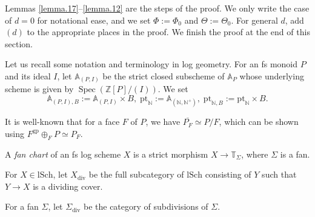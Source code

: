 \documentclass[10pt]{amsart}
\theoremstyle{definition}
\theoremstyle{remark}
\numberwithin{equation}{subsection}
\newcommand{\A}{\mathbb{A}}
\newcommand{\N}{\mathbb{N}}
\newcommand{\T}{\mathbb{T}}
\newcommand{\Z}{\mathbb{Z}}
\DeclareMathOperator{\Spec}{Spec}
\newcommand{\ol}{\overline}
\newcommand{\pt}{\mathrm{pt}}
\newcommand{\lSch}{\mathrm{lSch}}
\newcommand{\gp}{\mathrm{gp}}
\newcommand{\divi}{\mathrm{div}}
\begin{document}
Lemmas \ref{lemma.17}--\ref{lemma.12} are the steps of the proof.
We only write the case of $d=0$ for notational ease, and we set $\Phi:=\Phi_0$ and $\Theta:=\Theta_0$.
For general $d$, add $(d)$ to the appropriate places in the proof.
We finish the proof at the end of this section.

Let us recall some notation and terminology in log geometry.
For an fs monoid $P$ and its ideal $I$, let $\A_{(P,I)}$ be the strict closed subscheme of $\A_P$ whose underlying scheme is given by $\Spec(\Z[P]/(I))$.
We set
\[
\A_{(P,I),B}:=\A_{(P,I)}\times B,
\;
\pt_{\N}:=\A_{(\N,\N^+)},
\;
\pt_{\N,B}:=\pt_{\N}\times B.
\]


It is well-known that for a face $F$ of $P$,
we have $\ol{P_F}\simeq P/F$,
which can be shown using $F^\gp\oplus_F P\simeq P_F$.




A \emph{fan chart} of an fs log scheme $X$ is a strict morphism $X\to \T_{\Sigma}$, where $\Sigma$ is a fan.

For $X\in \lSch$, let $X_{\divi}$ be the full subcategory of $\lSch$ consisting of $Y$ such that $Y\to X$ is a dividing cover.

For a fan $\Sigma$, let $\Sigma_{\divi}$ be the category of subdivisions of $\Sigma$.
\end{document}
